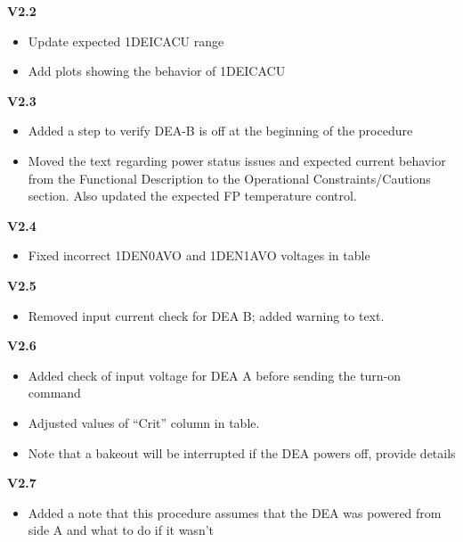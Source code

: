 \documentclass[11pt]{article}
\begin{document}
{\bf V2.2}
\begin{itemize}
\item Update expected 1DEICACU range
\item Add plots showing the behavior of 1DEICACU
\end{itemize}

{\bf V2.3}
\begin{itemize}
\item Added a step to verify DEA-B is off at the beginning of the procedure
\item Moved the text regarding power status issues and expected current behavior from the Functional Description to the Operational Constraints/Cautions section. Also updated the expected FP temperature control.
\end{itemize}

{\bf V2.4}
\begin{itemize}
\item Fixed incorrect 1DEN0AVO and 1DEN1AVO voltages in table
\end{itemize}

{\bf V2.5}
\begin{itemize}
\item Removed input current check for DEA B; added warning to text.
\end{itemize}

{\bf V2.6}
\begin{itemize}
\item Added check of input voltage for DEA A before sending the turn-on command
\item Adjusted values of ``Crit'' column in table. 
\item Note that a bakeout will be interrupted if the DEA powers off, provide details
\end{itemize}

{\bf V2.7}
\begin{itemize}
\item Added a note that this procedure assumes that the DEA was powered from side A and what to do if it wasn't
\end{itemize}
\end{document}
